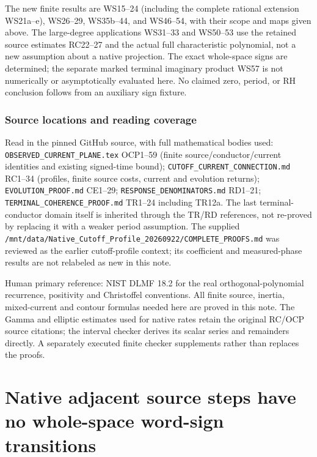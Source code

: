 \documentclass[11pt]{article}
\begin{document}
The new finite results are WS15--24 (including the complete rational extension WS21a--e), WS26--29, WS35b--44, and WS46--54, with their scope and maps given above. The large-degree applications WS31--33 and WS50--53 use the retained source estimates RC22--27 and the actual full characteristic polynomial, not a new assumption about a native projection. The exact whole-space signs are determined; the separate marked terminal imaginary product WS57 is not numerically or asymptotically evaluated here. No claimed zero, period, or RH conclusion follows from an auxiliary sign fixture.

\subsubsection{Source locations and reading coverage}\label{part3-source-locations-and-reading-coverage}

Read in the pinned GitHub source, with full mathematical bodies used: \texttt{OBSERVED\_\allowbreak{}CURRENT\_\allowbreak{}PLANE.tex} OCP1--59 (finite source/conductor/current identities and existing signed-time bound); \texttt{CUTOFF\_\allowbreak{}CURRENT\_\allowbreak{}CONNECTION.md} RC1--34 (profiles, finite source costs, current and evolution returns); \texttt{EVOLUTION\_\allowbreak{}PROOF.md} CE1--29; \texttt{RESPONSE\_\allowbreak{}DENOMINATORS.md} RD1--21; \texttt{TERMINAL\_\allowbreak{}COHERENCE\_\allowbreak{}PROOF.md} TR1--24 including TR12a. The last terminal-conductor domain itself is inherited through the TR/RD references, not re-proved by replacing it with a weaker period assumption. The supplied \texttt{/\allowbreak{}mnt/\allowbreak{}data/\allowbreak{}Native\_\allowbreak{}Cutoff\_\allowbreak{}Profile\_\allowbreak{}20260922/\allowbreak{}COMPLETE\_\allowbreak{}PROOFS.md} was reviewed as the earlier cutoff-profile context; its coefficient and measured-phase results are not relabeled as new in this note.

Human primary reference: NIST DLMF 18.2 for the real orthogonal-polynomial recurrence, positivity and Christoffel conventions. All finite source, inertia, mixed-current and contour formulas needed here are proved in this note. The Gamma and elliptic estimates used for native rates retain the original RC/OCP source citations; the interval checker derives its scalar series and remainders directly. A separately executed finite checker supplements rather than replaces the proofs.

\clearpage
\section{Native adjacent source steps have no whole-space word-sign transitions}\label{part4-native-adjacent-source-steps-have-no-whole-space-word-sign-transitions}
\end{document}
